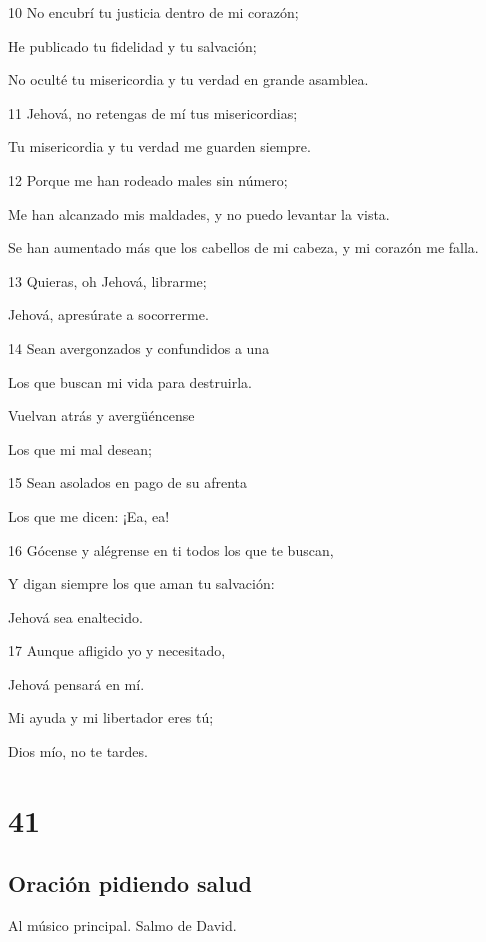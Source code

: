 \par 10 No encubrí tu justicia dentro de mi corazón;
\par He publicado tu fidelidad y tu salvación;
\par No oculté tu misericordia y tu verdad en grande asamblea.
\par 11 Jehová, no retengas de mí tus misericordias;
\par Tu misericordia y tu verdad me guarden siempre.
\par 12 Porque me han rodeado males sin número;
\par Me han alcanzado mis maldades, y no puedo levantar la vista.
\par Se han aumentado más que los cabellos de mi cabeza, y mi corazón me falla.
\par 13 Quieras, oh Jehová, librarme;
\par Jehová, apresúrate a socorrerme.
\par 14 Sean avergonzados y confundidos a una
\par Los que buscan mi vida para destruirla.
\par Vuelvan atrás y avergüéncense
\par Los que mi mal desean;
\par 15 Sean asolados en pago de su afrenta
\par Los que me dicen: ¡Ea, ea!
\par 16 Gócense y alégrense en ti todos los que te buscan,
\par Y digan siempre los que aman tu salvación:
\par Jehová sea enaltecido.
\par 17 Aunque afligido yo y necesitado,
\par Jehová pensará en mí.
\par Mi ayuda y mi libertador eres tú;
\par Dios mío, no te tardes.

\chapter{41}

\section*{Oración pidiendo salud}

\par Al músico principal. Salmo de David.


